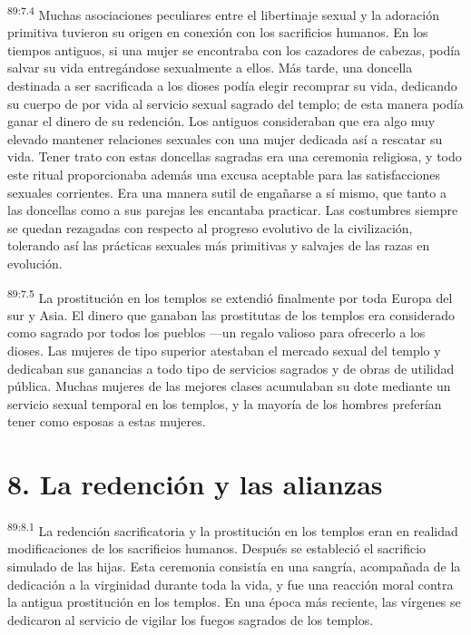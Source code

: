 \documentclass[twoside, 11pt]{book}
\begin{document}
\par
\textsuperscript{89:7.4} Muchas asociaciones peculiares entre el libertinaje sexual y la adoración primitiva tuvieron su origen en conexión con los sacrificios humanos. En los tiempos antiguos, si una mujer se encontraba con los cazadores de cabezas, podía salvar su vida entregándose sexualmente a ellos. Más tarde, una doncella destinada a ser sacrificada a los dioses podía elegir recomprar su vida, dedicando su cuerpo de por vida al servicio sexual sagrado del templo; de esta manera podía ganar el dinero de su redención. Los antiguos consideraban que era algo muy elevado mantener relaciones sexuales con una mujer dedicada así a rescatar su vida. Tener trato con estas doncellas sagradas era una ceremonia religiosa, y todo este ritual proporcionaba además una excusa aceptable para las satisfacciones sexuales corrientes. Era una manera sutil de engañarse a sí mismo, que tanto a las doncellas como a sus parejas les encantaba practicar. Las costumbres siempre se quedan rezagadas con respecto al progreso evolutivo de la civilización, tolerando así las prácticas sexuales más primitivas y salvajes de las razas en evolución.

\par
\textsuperscript{89:7.5} La prostitución en los templos se extendió finalmente por toda Europa del sur y Asia. El dinero que ganaban las prostitutas de los templos era considerado como sagrado por todos los pueblos ---un regalo valioso para ofrecerlo a los dioses. Las mujeres de tipo superior atestaban el mercado sexual del templo y dedicaban sus ganancias a todo tipo de servicios sagrados y de obras de utilidad pública. Muchas mujeres de las mejores clases acumulaban su dote mediante un servicio sexual temporal en los templos, y la mayoría de los hombres preferían tener como esposas a estas mujeres.

\section*{8. La redención y las alianzas}
\par
\textsuperscript{89:8.1} La redención sacrificatoria y la prostitución en los templos eran en realidad modificaciones de los sacrificios humanos. Después se estableció el sacrificio simulado de las hijas. Esta ceremonia consistía en una sangría, acompañada de la dedicación a la virginidad durante toda la vida, y fue una reacción moral contra la antigua prostitución en los templos. En una época más reciente, las vírgenes se dedicaron al servicio de vigilar los fuegos sagrados de los templos.
\end{document}
